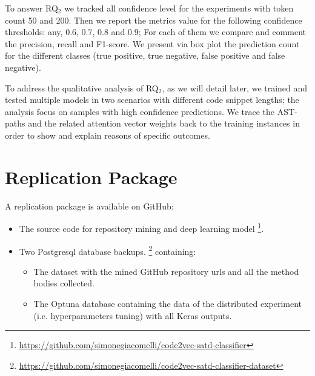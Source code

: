 To answer RQ$_2$ we tracked all confidence level for the experiments with token count 50 and 200. Then we report the metrics value for the following confidence thresholds: any, 0.6, 0.7, 0.8 and 0.9; For each of them we compare and comment the precision, recall and F1-score. We present via box plot the prediction count for the different classes (true positive, true negative, false positive and false negative). 

To address the qualitative analysis of RQ$_2$, as we will detail later, we trained and tested multiple models in two scenarios with different code snippet lengths; the analysis focus on samples with high confidence predictions. We trace the AST-paths and the related attention vector weights back to the training instances in order to show and explain reasons of specific outcomes.



\section{Replication Package}
A replication package is available on GitHub:
\begin{itemize}
    \item The source code for repository mining and deep learning model \footnote{\url{https://github.com/simonegiacomelli/code2vec-satd-classifier}}. 
    \item Two Postgresql database backups. \footnote{\url{https://github.com/simonegiacomelli/code2vec-satd-classifier-dataset}} containing:
    \begin{itemize}
\item The dataset with the mined GitHub repository urls and all the method bodies collected.
\item The Optuna database containing the data of the distributed experiment (i.e. hyperparameters tuning) with all Keras outputs. 
\end{itemize}
\end{itemize}
